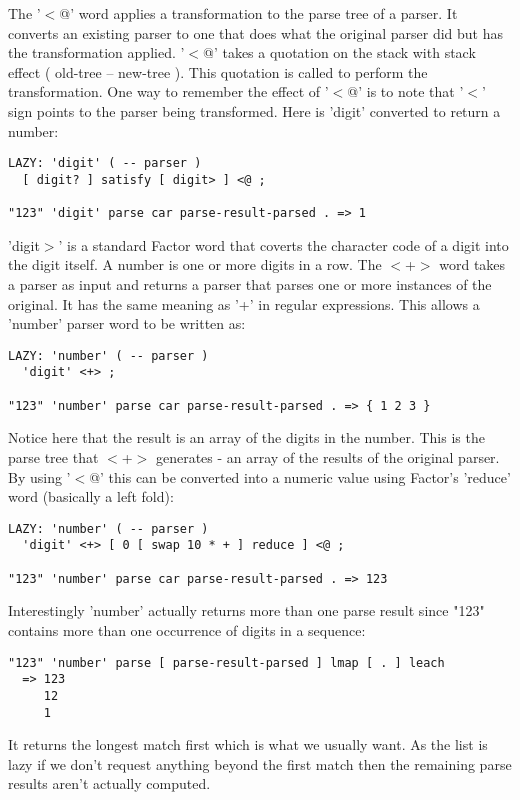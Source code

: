 The '$<$@' word applies a transformation to the parse tree of a
parser. It converts an existing parser to one that does what the
original parser did but has the transformation applied. '$<$@' takes a
quotation on the stack with stack effect ( old-tree -- new-tree
). This quotation is called to perform the transformation. One way to
remember the effect of '$<$@' is to note that '$<$' sign points to the
parser being transformed. Here is 'digit' converted to return a
number:

\begin{verbatim}
LAZY: 'digit' ( -- parser )
  [ digit? ] satisfy [ digit> ] <@ ;

"123" 'digit' parse car parse-result-parsed . => 1
\end{verbatim}

'digit$>$' is a standard Factor word that coverts the character code of
a digit into the digit itself. A number is one or more digits in a
row. The $<$+$>$ word takes a parser as input and returns a parser that
parses one or more instances of the original. It has the same meaning
as '+' in regular expressions. This allows a 'number' parser word to
be written as:

\begin{verbatim}
LAZY: 'number' ( -- parser )
  'digit' <+> ;

"123" 'number' parse car parse-result-parsed . => { 1 2 3 }
\end{verbatim}

Notice here that the result is an array of the digits in the
number. This is the parse tree that $<$+$>$ generates - an array of the
results of the original parser. By using '$<$@' this can be converted
into a numeric value using Factor's 'reduce' word (basically a left
fold):

\begin{verbatim}
LAZY: 'number' ( -- parser )
  'digit' <+> [ 0 [ swap 10 * + ] reduce ] <@ ;

"123" 'number' parse car parse-result-parsed . => 123
\end{verbatim}

Interestingly 'number' actually returns more than one parse result
since "123" contains more than one occurrence of digits in a sequence:

\begin{verbatim}
"123" 'number' parse [ parse-result-parsed ] lmap [ . ] leach 
  => 123
     12
     1
\end{verbatim}

It returns the longest match first which is what we usually want. As
the list is lazy if we don't request anything beyond the first match
then the remaining parse results aren't actually computed.

